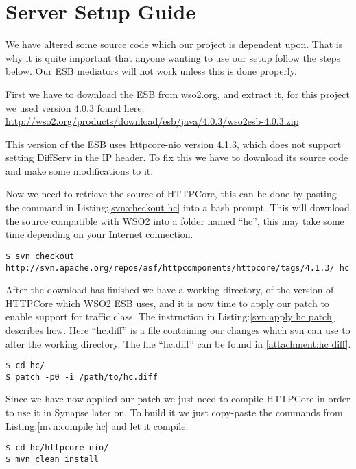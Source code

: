\section{Server Setup Guide}\label{Server Setup Guide}
	\begin{shaded}
	We have altered some source code which our project is dependent upon. That is why it is quite important that anyone wanting to use our setup follow the steps below. Our ESB mediators will not work unless this is done properly.
	\end{shaded}

	First we have to download the ESB from wso2.org, and extract it, for this project we used version 4.0.3 found here:
\url{http://wso2.org/products/download/esb/java/4.0.3/wso2esb-4.0.3.zip}

	This version of the ESB uses httpcore-nio version 4.1.3, which does not support setting DiffServ in the IP header. To fix this we have to download its source code and make some modifications to it.

	Now we need to retrieve the source of HTTPCore, this can be done by pasting the command in Listing:\ref{svn:checkout hc} into a bash prompt. This will download the source compatible with WSO2 into a folder named “hc”, this may take some time depending on your Internet connection.
\lstset{language=bash, style=shell}
\begin{lstlisting}[frame=single, caption={Checkout HttpCore source}, label=svn:checkout hc, breaklines=true]
$ svn checkout http://svn.apache.org/repos/asf/httpcomponents/httpcore/tags/4.1.3/ hc
\end{lstlisting}

	After the download has finished we have a working directory, of the version of HTTPCore which WSO2 ESB uses, and it is now time to apply our patch to enable support for traffic class. The instruction in Listing:\ref{svn:apply hc patch} describes how. Here “hc.diff” is a file containing our changes which svn can use to alter the working directory. The file “hc.diff” can be found in \ref{attachment:hc diff}.
\begin{lstlisting}[frame=single, caption={Apply HC patch}, label=svn:apply hc patch]
$ cd hc/
$ patch -p0 -i /path/to/hc.diff
\end{lstlisting}

	Since we have now applied our patch we just need to compile HTTPCore in order to use it in Synapse later on. To build it we just copy-paste the commands from Listing:\ref{mvn:compile hc} and let it compile.
\begin{lstlisting}[frame=single, caption={Build HttpCore-NIO}, label=mvn:compile hc, breaklines=true]
$ cd hc/httpcore-nio/
$ mvn clean install
\end{lstlisting}

